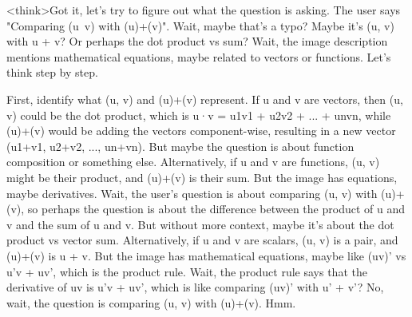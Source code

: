 <think>Got it, let's try to figure out what the question is asking. The user says "Comparing (u\, v) with (u)+(v)". Wait, maybe that's a typo? Maybe it's (u, v) with u + v? Or perhaps the dot product vs sum? Wait, the image description mentions mathematical equations, maybe related to vectors or functions. Let's think step by step.

First, identify what (u, v) and (u)+(v) represent. If u and v are vectors, then (u, v) could be the dot product, which is u·v = u1v1 + u2v2 + ... + unvn, while (u)+(v) would be adding the vectors component-wise, resulting in a new vector (u1+v1, u2+v2, ..., un+vn). But maybe the question is about function composition or something else. Alternatively, if u and v are functions, (u, v) might be their product, and (u)+(v) is their sum. But the image has equations, maybe derivatives. Wait, the user's question is about comparing (u, v) with (u)+(v), so perhaps the question is about the difference between the product of u and v and the sum of u and v. But without more context, maybe it's about the dot product vs vector sum. Alternatively, if u and v are scalars, (u, v) is a pair, and (u)+(v) is u + v. But the image has mathematical equations, maybe like (uv)' vs u'v + uv', which is the product rule. Wait, the product rule says that the derivative of uv is u'v + uv', which is like comparing (uv)' with u' + v'? No, wait, the question is comparing (u, v) with (u)+(v). Hmm.

